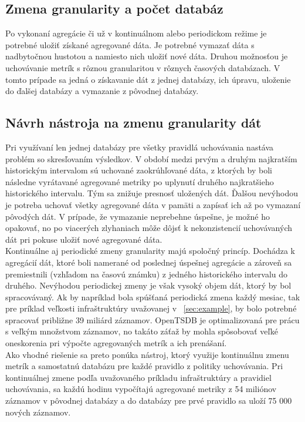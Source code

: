 \documentclass[printed,11pt,twoside,color,cover,table]{fithesis3}
\begin{document}
\subsection{Zmena granularity a počet databáz}
Po vykonaní agregácie či už v kontinuálnom alebo periodickom režime je potrebné uložiť získané agregované dáta. Je potrebné vymazať dáta s nadbytočnou hustotou a namiesto nich uložiť nové dáta.
Druhou možnosťou je uchovávanie metrík s rôznou granularitou v rôznych časových databázach. V tomto prípade sa jedná o získavanie dát z jednej databázy, ich úpravu, uloženie do ďalšej databázy a vymazanie 
z pôvodnej databázy.

\subsection{Návrh nástroja na  zmenu granularity dát}
Pri využívaní len jednej databázy pre všetky pravidlá uchovávania nastáva problém so skresľovaním výsledkov. V období medzi prvým a druhým najkratším historickým intervalom sú uchované zaokrúhľované dáta,
z ktorých by boli následne vyrátavané agregované metriky po uplynutí druhého najkratšieho historického intervalu. Tým sa znižuje presnosť uložených dát. Ďalšou nevýhodou je potreba uchovať všetky agregované 
dáta v pamäti a zapísať ich až po vymazaní pôvodých dát. V prípade, že vymazanie neprebehne úspešne, je možné ho opakovať, no po viacerých zlyhaniach môže dôjsť k nekonzistencií uchovávaných dát pri pokuse uložiť 
nové agregované dáta.
\\Kontinuálne aj periodické zmeny granularity majú spoločný princíp. Dochádza k agregácií dát, ktoré boli namerané od poslednej úspešnej agregácie a zároveň sa premiestnili (vzhľadom na časovú známku) z jedného
historického intervalu do druhého. Nevýhodou periodickej zmeny je však vysoký objem dát, ktorý by bol spracovávaný. Ak by napríklad bola spúšťaná periodická zmena každý mesiac, tak pre príklad veľkosti 
infraštruktúry uvažovanej v ~\ref{sec:example}, by bolo potrebné spracovať približne 39 miliárd záznamov. OpenTSDB je optimalizovaná pre prácu s veľkým množstvom záznamov, no takáto záťaž by mohla spôsobovať 
veľké oneskorenia pri výpočte agregovaných metrík a ich prenášaní.
\\Ako vhodné riešenie sa preto ponúka nástroj, ktorý využije kontinuálnu zmenu metrík a samostatnú databázu pre každé pravidlo z politiky uchovávania. Pri kontinuálnej zmene podľa uvažovaného príkladu 
infraštruktúry a pravidiel uchovávania, sa každú hodinu vypočítajú agregované metriky z 54 miliónov záznamov v pôvodnej databázy a do databázy pre prvé pravidlo sa uloží 75 000 nových záznamov. 
\end{document}
